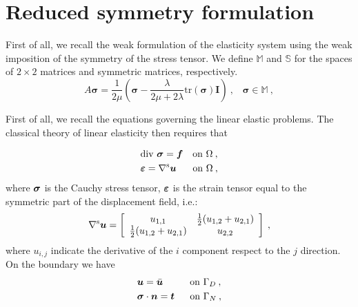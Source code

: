 \section{Reduced symmetry formulation}
First of all, we recall the weak formulation of the elasticity system using the weak imposition of the symmetry of the stress tensor.
We define $\mathbb{M}$ and $\mathbb{S}$ for the spaces of $2\times 2$ matrices and symmetric matrices, respectively.
\begin{equation}
A\bm{\sigma} = \frac{1}{2\mu}\left( \bm{\sigma} - \frac{\lambda}{2\mu+2\lambda}\mbox{tr}(\bm{\sigma})\bm{I}\right)\:, 
\hspace{10pt} \bm{\sigma}\in \mathbb{M\:,} 
\end{equation}






First of all, we recall the equations governing the linear elastic problems.
The classical theory of linear elasticity then requires that

\begin{equation} \label{eq:equilibium_congruence}
\begin{split}
&\mbox{div }\bm{\sigma} = \bm{f} \hspace{10pt} \mbox{on } \Omega\:, \\
&\bm{\varepsilon} = \nabla^\text{s}\bm{u} \hspace{17pt} \mbox{on } \Omega\:,
\end{split}
\end{equation}
where $\bm{\sigma}$ is the Cauchy stress tensor, $\bm{\varepsilon}$ is the strain tensor equal to the symmetric part of the displacement field, i.e.:
\begin{equation} \label{eq:symmetric_gradient}
\nabla^\text{s}\bm{u} =
\left[
\begin{array}{cc}
u_{1,1} & \frac{1}{2}(u_{1,2}+u_{2,1}) \\
\frac{1}{2}(u_{1,2}+u_{2,1}) & u_{2,2} 
\end{array}
\right]\:,
\end{equation}
where $u_{i,j}$ indicate the derivative of the $i$ component respect to the $j$ direction. 
On the boundary we have
\begin{equation} \label{eq:equilibium_congruence}
\begin{split}
&\bm{u} = \bar{\bm{u}} \hspace{28pt} \mbox{on } \Gamma_{D}\:, \\
&\bm{\sigma}\cdot \bm{n} = \bm{t} \hspace{16pt} \mbox{on } \Gamma_{N}\:,
\end{split}
\end{equation}

